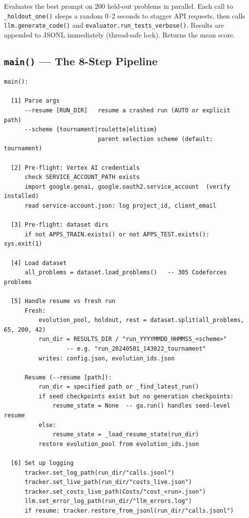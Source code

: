 \documentclass[11pt,a4paper]{report}
\newcommand{\fn}[1]{\texttt{#1}}
\begin{document}
Evaluates the best prompt on 200 held-out problems in parallel.  Each call to
\fn{\_holdout\_one()} sleeps a random 0--2 seconds to stagger API requests, then
calls \fn{llm.generate\_code()} and \fn{evaluator.run\_tests\_verbose()}.  Results
are appended to JSONL immediately (thread-safe lock).  Returns the mean score.

\subsection{\fn{main()} --- The 8-Step Pipeline}

\begin{lstlisting}[style=chain]
main():

  [1] Parse args
      --resume [RUN_DIR]   resume a crashed run (AUTO or explicit path)
      --scheme {tournament|roulette|elitism}
                           parent selection scheme (default: tournament)

  [2] Pre-flight: Vertex AI credentials
      check SERVICE_ACCOUNT_PATH exists
      import google.genai, google.oauth2.service_account  (verify installed)
      read service-account.json: log project_id, client_email

  [3] Pre-flight: dataset dirs
      if not APPS_TRAIN.exists() or not APPS_TEST.exists(): sys.exit(1)

  [4] Load dataset
      all_problems = dataset.load_problems()   -- 305 Codeforces problems

  [5] Handle resume vs fresh run
      Fresh:
          evolution_pool, holdout, rest = dataset.split(all_problems, 65, 200, 42)
          run_dir = RESULTS_DIR / "run_YYYYMMDD_HHMMSS_<scheme>"
                  -- e.g. "run_20240501_143022_tournament"
          writes: config.json, evolution_ids.json

      Resume (--resume [path]):
          run_dir = specified path or _find_latest_run()
          if seed checkpoints exist but no generation checkpoints:
              resume_state = None  -- ga.run() handles seed-level resume
          else:
              resume_state = _load_resume_state(run_dir)
          restore evolution_pool from evolution_ids.json

  [6] Set up logging
      tracker.set_log_path(run_dir/"calls.jsonl")
      tracker.set_live_path(run_dir/"costs_live.json")
      tracker.set_costs_live_path(Costs/"cost_<run>.json")
      llm.set_error_log_path(run_dir/"llm_errors.log")
      if resume: tracker.restore_from_jsonl(run_dir/"calls.jsonl")


\end{lstlisting}
\end{document}
